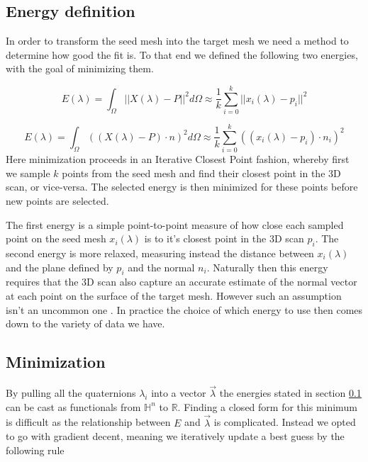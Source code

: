 \documentclass[sigconf]{acmart}
\begin{document}
\subsection{Energy definition} \label{energy_definition}
In order to transform the seed mesh into the target mesh we need a method to determine how good the fit is. To that end we defined the following two energies, with the goal of minimizing them. 

\begin{equation}
\label{eqn:03}
E(\lambda) = \int_{\Omega}||X(\lambda) - P||^{2}d\Omega \approx \frac{1}{k}\sum_{i=0}^{k}||x_{i}(\lambda) - p_{i}||^{2}
\end{equation}

\begin{equation}
\label{eqn:04}
E(\lambda) = \int_{\Omega}((X(\lambda) - P) \cdot n)^{2}d\Omega \approx \frac{1}{k}\sum_{i=0}^{k}((x_{i}(\lambda) - p_{i}) \cdot n_{i})^{2}
\end{equation}
Here minimization proceeds in an Iterative Closest Point \cite{Bouaziz:2015} fashion, whereby first we sample $k$ points from the seed mesh and find their closest point in the 3D scan, or vice-versa. The selected energy is then minimized for these points before new points are selected.

The first energy is a simple point-to-point measure of how close each sampled point on the seed mesh $x_{i}(\lambda)$ is to it's closest point in the 3D scan $p_{i}$. The second energy is more relaxed, measuring instead the distance between $x_{i}(\lambda)$ and the plane defined by $p_{i}$ and the normal $n_{i}$. Naturally then this energy requires that the 3D scan also capture an accurate estimate of the normal vector at each point on the surface of the target mesh. However such an assumption isn't an uncommon one \cite{Hoppe:2006}. In practice the choice of which energy to use then comes down to the variety of data we have.

\subsection{Minimization}
By pulling all the quaternions $\lambda_{i}$ into a vector $\vec{\lambda}$ the energies stated in section \ref{energy_definition} can be cast as functionals from $\mathbb{H}^{n}$ to $\mathbb{R}$. Finding a closed form for this minimum is difficult as the relationship between $E$ and $\vec{\lambda}$ is complicated. Instead we opted to go with gradient decent, meaning we iteratively update a best guess by the following rule
\end{document}
